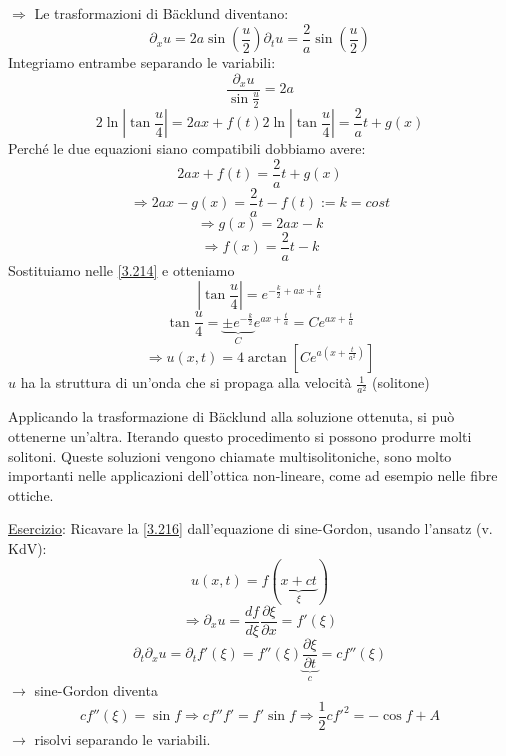 \documentclass[a4paper,11pt]{report}
\begin{document}
$\Rightarrow$ Le trasformazioni di B\"acklund diventano:
\begin{subequations}
\begin{equation}
\partial_x u = 2a\sin\left(\frac{u}{2}\right) 
\label{3.213a}
\end{equation}
\begin{equation}
\partial_t u = \frac{2}{a}\sin\left(\frac{u}{2}\right) 
\label{3.213b}
\end{equation}
\end{subequations}
Integriamo entrambe separando le variabili:
\[
\frac{\partial_x u }{\sin\frac{u}{2}}=2a
\]
\begin{subequations}
\begin{equation}
2 \ln \left| \tan \frac{u}{4}\right|=2ax + f(t) 
\label{3.214a}
\end{equation}
\begin{equation}
2 \ln \left| \tan \frac{u}{4}\right|= \frac{2}{a} t + g(x) 
\label{3.214b}
\end{equation}
\label{3.214}
\end{subequations}
Perch\'e le due equazioni siano compatibili dobbiamo avere:
\begin{equation}
2ax + f(t)=\frac{2}{a}t + g(x) 
\label{3.215}
\end{equation}
\[
\Rightarrow 2ax-g(x)=\frac{2}{a}t - f(t):=k = cost
\]
\[
\Rightarrow g(x)=2ax-k
\]
\[
\Rightarrow f(x)=\frac{2}{a}t-k
\]
Sostituiamo nelle \eqref{3.214} e otteniamo
\[
\left| \tan \frac{u}{4}\right| = e^{-\frac{k}{2}+ax+\frac{t}{a}}
\]
\[
\tan \frac{u}{4} = \underbrace{\pm e^{-\frac{k}{2}}}_{C} e^{ax + \frac{t}{a}}=Ce^{ax + \frac{t}{a}}
\]
\begin{equation}
\Rightarrow u(x,t)=4\arctan \left[Ce^{a\left(x + \frac{t}{a^2}\right)}\right] 
\label{3.216}
\end{equation}
$u$ ha la struttura di un'onda che si propaga alla velocit\`a $\frac{1}{a^2}$ (solitone)

Applicando la trasformazione di B\"acklund alla soluzione ottenuta, si pu\`o ottenerne un'altra.
Iterando questo procedimento si possono produrre molti solitoni.
Queste soluzioni vengono chiamate multisolitoniche, sono molto importanti nelle applicazioni dell'ottica non-lineare, come ad esempio nelle fibre ottiche.

\medskip

\underline{Esercizio}: Ricavare la \eqref{3.216} dall'equazione di sine-Gordon, usando l'ansatz (v. KdV): %
\[
u(x,t)=f(\underbrace{x+ct}_{\xi})
\]
\[
\Rightarrow \partial_x u = \frac{df}{d\xi}\frac{\partial \xi}{\partial x}=f'(\xi)
\]
\[
\partial_t\partial_xu=\partial_tf'(\xi)=f''(\xi) \underbrace{ \frac{\partial \xi}{\partial t} }_{c} = cf''(\xi)
\]
$\rightarrow$ sine-Gordon diventa
\[
c f''(\xi)=\sin f \Rightarrow cf''f'=f' \sin f \Rightarrow \frac{1}{2} c f'^2 = -\cos f + A
\]
$\rightarrow$ risolvi separando le variabili.
\end{document}
